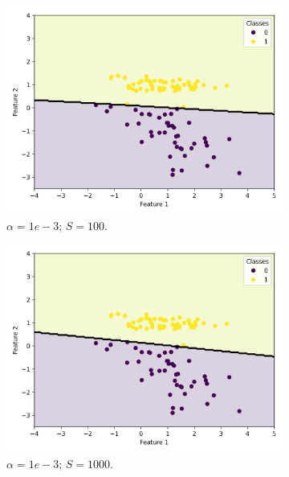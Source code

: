 \documentclass{article}
\begin{document}
\begin{figure}
\begin{subfigure}[t]{0.24\textwidth}
    \includegraphics[width=\linewidth]{scatter_predictions_with_contour_3_learning_rate_10000_sample_100.png}
    \caption{$\alpha = 1e-3$; $S = 100$.}
  \end{subfigure}
  \hfill
  \begin{subfigure}[t]{0.24\textwidth}
    \centering
    \includegraphics[width=\linewidth]{scatter_predictions_with_contour_3_learning_rate_10000_sample_1000.png}
    \caption{$\alpha = 1e-3$; $S = 1000$.}
  \end{subfigure}
  \hfill
  \begin{subfigure}[t]{0.24\textwidth}
    \centering

\end{subfigure}
\end{figure}
\end{document}

